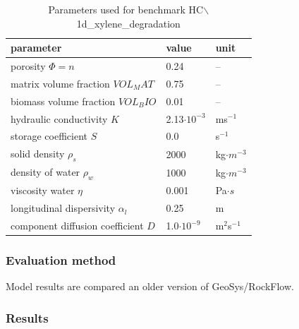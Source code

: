 \begin{table}[htbp]
\caption{Parameters used for benchmark HC$\backslash$1d\_xylene\_degradation }
\centering
\begin{tabular}{|l|l|l|}
\hline
parameter & value & unit \\
\hline
porosity $\Phi = n $  & 0.24 &  --  \\			
\hline
matrix volume fraction $VOL_MAT $  & 0.75 &  --  \\			
\hline
biomass volume fraction $VOL_BIO $  & 0.01 &  --  \\			
\hline
hydraulic conductivity $K$ & 2.13$\cdot 10^{-3}$ & ms$^{-1}$ \\
\hline
storage coefficient $S$ & 0.0 & s$^{-1}$ \\
\hline
solid density $\rho_s$ & 2000 &  kg$\cdot m^{-3}$ \\
\hline
density of water $\rho_w$ & 1000 & kg$\cdot m^{-3}$ \\
\hline
viscosity water $\eta$ & 0.001 & Pa$\cdot s$ \\
\hline
longitudinal dispersivity $\alpha_l$ & 0.25 & m \\
\hline
component diffusion coefficient $D$ & 1.0$\cdot 10^{-9}$ & m$^2$s$^{-1}$ \\
\hline
\end{tabular}
\label{l_tab_benchmark_1d_xylene}
\end{table}

\subsubsection*{Evaluation method}

Model results are compared an older version of GeoSys/RockFlow.

\subsubsection*{Results}

